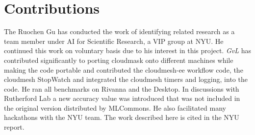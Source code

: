 \documentclass[sigplan,screen]{acmart}
\begin{document}






\section*{Contributions}

The Ruochen Gu has conducted the work of identifying related research as a team member under AI for Scientific Research, a VIP group at NYU. He continued this work on voluntary basis due to his interest in this project. {\em GvL} has contributed significantly to porting cloudmask onto different machines while making the code portable and contributed the cloudmesh-ee workflow code, the cloudmesh StopWatch and integrated the cloudmesh timers and logging, into the code. He ran all benchmarks on Rivanna and the Desktop.   In discussions with Rutherford Lab a new accuracy value was introduced that was not included in the original version distributed by MLCommons. He also facilitated many hackathons with the NYU team. The work described here is cited in the NYU report.

\appendix

\onecolumn

\end{document}
